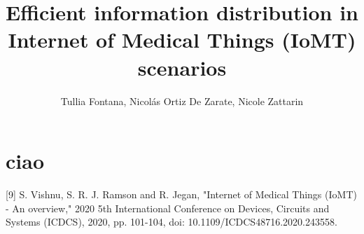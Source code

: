 \documentclass[10pt, a4paper, twocolumn]{article}
\title{Efficient information distribution in Internet of Medical Things (IoMT) scenarios} %
\author{Tullia Fontana, Nicolás Ortiz De Zarate, Nicole Zattarin}
\date{}
\theoremstyle{definition}
\begin{document}
\section{ciao}


[9] S. Vishnu, S. R. J. Ramson and R. Jegan, "Internet of Medical Things (IoMT) - An overview," 2020 5th International Conference on Devices, Circuits and Systems (ICDCS), 2020, pp. 101-104, doi: 10.1109/ICDCS48716.2020.243558.


\end{document}
